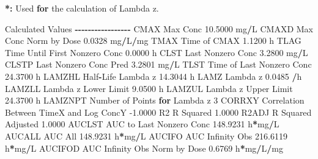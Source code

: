 \documentclass[
  12pt,
]{krantz}
\newenvironment{Shaded}{\begin{snugshade}}{\end{snugshade}}
\newcommand{\ControlFlowTok}[1]{\textcolor[rgb]{0.13,0.29,0.53}{\textbf{#1}}}
\newcommand{\DecValTok}[1]{\textcolor[rgb]{0.00,0.00,0.81}{#1}}
\newcommand{\ErrorTok}[1]{\textcolor[rgb]{0.64,0.00,0.00}{\textbf{#1}}}
\newcommand{\FloatTok}[1]{\textcolor[rgb]{0.00,0.00,0.81}{#1}}
\newcommand{\NormalTok}[1]{#1}
\newcommand{\OperatorTok}[1]{\textcolor[rgb]{0.81,0.36,0.00}{\textbf{#1}}}
\newcommand{\StringTok}[1]{\textcolor[rgb]{0.31,0.60,0.02}{#1}}
\begin{document}
\begin{Shaded}
\begin{Highlighting}[]
\OperatorTok{*}\ErrorTok{:}\StringTok{ }\NormalTok{Used }\ControlFlowTok{for}\NormalTok{ the calculation of Lambda z.}


\NormalTok{Calculated Values}
\OperatorTok{{-}{-}{-}{-}{-}{-}{-}{-}{-}{-}{-}{-}{-}{-}{-}{-}{-}}
\NormalTok{CMAX       Max Conc                                       }\FloatTok{10.5000}\NormalTok{ mg}\OperatorTok{/}\NormalTok{L}
\NormalTok{CMAXD      Max Conc Norm by Dose                           }\FloatTok{0.0328}\NormalTok{ mg}\OperatorTok{/}\NormalTok{L}\OperatorTok{/}\NormalTok{mg}
\NormalTok{TMAX       Time of CMAX                                    }\FloatTok{1.1200}\NormalTok{ h}
\NormalTok{TLAG       Time Until First Nonzero Conc                   }\FloatTok{0.0000}\NormalTok{ h}
\NormalTok{CLST       Last Nonzero Conc                               }\FloatTok{3.2800}\NormalTok{ mg}\OperatorTok{/}\NormalTok{L}
\NormalTok{CLSTP      Last Nonzero Conc Pred                          }\FloatTok{3.2801}\NormalTok{ mg}\OperatorTok{/}\NormalTok{L}
\NormalTok{TLST       Time of Last Nonzero Conc                      }\FloatTok{24.3700}\NormalTok{ h}
\NormalTok{LAMZHL     Half}\OperatorTok{{-}}\NormalTok{Life Lambda z                             }\FloatTok{14.3044}\NormalTok{ h}
\NormalTok{LAMZ       Lambda z                                        }\FloatTok{0.0485} \OperatorTok{/}\NormalTok{h}
\NormalTok{LAMZLL     Lambda z Lower Limit                            }\FloatTok{9.0500}\NormalTok{ h}
\NormalTok{LAMZUL     Lambda z Upper Limit                           }\FloatTok{24.3700}\NormalTok{ h}
\NormalTok{LAMZNPT    Number of Points }\ControlFlowTok{for}\NormalTok{ Lambda z                   }\DecValTok{3}
\NormalTok{CORRXY     Correlation Between TimeX and Log ConcY        }\FloatTok{{-}1.0000} 
\NormalTok{R2         R Squared                                       }\FloatTok{1.0000} 
\NormalTok{R2ADJ      R Squared Adjusted                              }\FloatTok{1.0000} 
\NormalTok{AUCLST     AUC to Last Nonzero Conc                      }\FloatTok{148.9231}\NormalTok{ h}\OperatorTok{*}\NormalTok{mg}\OperatorTok{/}\NormalTok{L}
\NormalTok{AUCALL     AUC All                                       }\FloatTok{148.9231}\NormalTok{ h}\OperatorTok{*}\NormalTok{mg}\OperatorTok{/}\NormalTok{L}
\NormalTok{AUCIFO     AUC Infinity Obs                              }\FloatTok{216.6119}\NormalTok{ h}\OperatorTok{*}\NormalTok{mg}\OperatorTok{/}\NormalTok{L}
\NormalTok{AUCIFOD    AUC Infinity Obs Norm by Dose                   }\FloatTok{0.6769}\NormalTok{ h}\OperatorTok{*}\NormalTok{mg}\OperatorTok{/}\NormalTok{L}\OperatorTok{/}\NormalTok{mg}

\end{Highlighting}
\end{Shaded}
\end{document}
